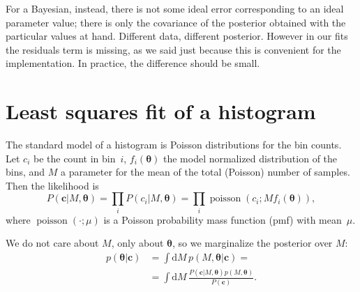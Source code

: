 
For a Bayesian, instead, there is not some ideal error corresponding to an
ideal parameter value; there is only the covariance of the posterior obtained
with the particular values at hand. Different data, different posterior.
However in our fits the residuals term is missing, as we said just because this
is convenient for the implementation. In practice, the difference should be
small.

\section{Least squares fit of a histogram}

The standard model of a histogram is Poisson distributions for the bin counts.
Let $c_i$ be the count in bin~$i$, $f_i(\boldsymbol\theta)$ the model
normalized distribution of the bins, and $M$ a parameter for the mean of the
total (Poisson) number of samples. Then the likelihood is
%
\begin{equation}
    P(\mathbf c|M,\boldsymbol\theta) =
    \prod_i P(c_i|M,\boldsymbol\theta) =
    \prod_i \operatorname{poisson}(c_i;Mf_i(\boldsymbol\theta)),
\end{equation}
%
where $\operatorname{poisson}(\cdot;\mu)$ is a Poisson probability mass
function (pmf) with mean~$\mu$.

We do not care about $M$, only about $\boldsymbol\theta$, so we marginalize
the posterior over $M$:
%
\begin{align}
    p(\boldsymbol\theta|\mathbf c)
    &= \int \mathrm dM\, p(M,\boldsymbol\theta|\mathbf c) = \\
    &= \int \mathrm dM\,
    \frac {P(\mathbf c|M,\boldsymbol\theta) p(M,\boldsymbol\theta)}
    {P(\mathbf c)}.
\end{align}

